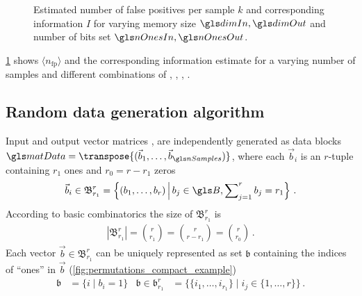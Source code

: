 \begin{figure}
	\caption[Estimated number of false positives]{Estimated number of false positives per sample \(k\) and corresponding information \(I\) for varying memory size \(\dimIn, \dimOut\) and number of bits set \(\nOnesIn, \nOnesOut\).}
	\label{fig:expected_err}
\end{figure}\ignorespaces
\cref{fig:expected_err} shows \( \langle n_{\mathrm{fp}} \rangle \) and the corresponding information estimate for a varying number of samples \nSamples and different combinations of \dimIn, \dimOut, \nOnesIn, \nOnesOut.

\subsection{Random data generation algorithm}
\label{sec:random_data_generation}

Input and output vector matrices \matIn, \matOut are independently generated as data blocks $\matData = \transpose{(\vec b_1, \ldots, \vec b_{\nSamples})}$, where each $\vec b_i$ is an $r$-tuple containing $r_1$ ones and $r_0 = r - r_1$ zeros
\begin{align}
	\vec b_i \in \mathfrak{B}^r_{r_1} = \left\{(b_{1}, \ldots, b_{r}) \,\middle|\, b_j \in \B, \sum\nolimits_{j = 1}^r b_j = r_1 \right\} \,.
\end{align}
According to basic combinatorics the size of \(\mathfrak{B}^r_{r_1}\) is
\begin{align}
	|\mathfrak{B}^r_{r_1}| = \binom{r}{r_1} = \binom{r}{r - r_1} = \binom{r}{r_0} \,.
\end{align}
Each vector $\vec b \in \mathfrak{B}^r_{r_1}$ can be uniquely represented as set $\mathfrak{b}$ containing the indices of \enquote{ones} in $\vec b$ (\vref{fig:permutations_compact_example})
\begin{align}
	\mathfrak{b} &= \{i \mid b_i = 1\} & \mathfrak{b} \in \mathfrak{b}^r_{r_1} &= \{\{i_1, \ldots, i_{r_1}\} \mid i_j \in \{1, \ldots, r\}\} \,.
\end{align}

